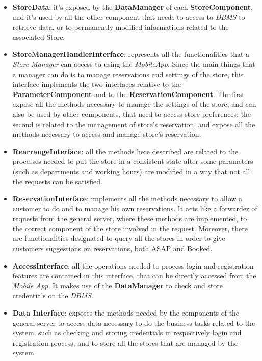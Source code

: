 \documentclass{article}
\begin{document}
	\begin{itemize}
		\item {\bfseries StoreData}: it's exposed by the {\bfseries DataManager} of each {\bfseries StoreComponent}, and it's used by all the other component that needs to access to \emph{DBMS} to retrieve data, or to permanently modified informations related to the associated Store.
		\item {\bfseries StoreManagerHandlerInterface}: represents all the functionalities that a \emph{Store Manager} can access to using the \emph{MobileApp}. Since the main things that a manager can do is to manage reservations and settings of the store, this interface implements the two interfaces relative to the {\bfseries ParameterComponent} and to the {\bfseries ReservationComponent}. The first expose all the methods necessary to manage the settings of the store, and can also be used by other components, that need to access store preferences; the second is related to the management of store's reservation, and expose all the methods necessary to access and manage store's reservation.
		\item{\bfseries RearrangeInterface}: all the methods here described are related to the processes needed to put the store in a consistent state after some parameters (such as departments and working hours) are modified in a way that not all the requests can be satisfied.
		\item{\bfseries ReservationInterface}: implements all the methods necessary to allow a customer to do and to manage his own reservations. It acts like a forwarder of requests from the general server, where these methods are implemented, to the correct component of the store involved in the request. Moreover, there are functionalities designated to query all the stores in order to give customers suggestions on reservations, both ASAP and Booked.
		\item{\bfseries AccessInterface}: all the operations needed to process login and registration features are contained in this interface, that can be directly accessed from the \emph{Mobile App}. It makes use of the {\bfseries DataManager} to check and store credentials on the \emph{DBMS}.
		\item{\bfseries Data Interface}: exposes the methods needed by the components of the general server to access data necessary to do the business tasks related to the system, such as checking and storing credentials in respectively login and registration process, and to store all the stores that are managed by the system.

\end{itemize}
\end{document}
